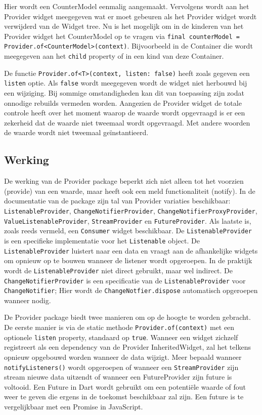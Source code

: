 Hier wordt een CounterModel eenmalig aangemaakt. Vervolgens wordt aan het Provider widget meegegeven wat er moet gebeuren als het Provider widget wordt verwijderd van de Widget tree. Nu is het mogelijk om in de kinderen van het Provider widget het CounterModel op te vragen via \verb|final counterModel = Provider.of<CounterModel>(context)|.
Bijvoorbeeld in de Container die wordt meegegeven aan het \verb|child| property of in een kind van deze Container.

De functie \verb|Provider.of<T>(context, listen: false)| heeft zoals gegeven een \verb|listen| optie. Als \verb|false| wordt meegegeven wordt de widget niet herbouwd bij een wijziging. Bij sommige omstandigheden kan dit van toepassing zijn zodat onnodige rebuilds vermeden worden. Aangezien de Provider widget de totale controle heeft over het moment waarop de waarde wordt opgevraagd is er een zekerheid dat de waarde niet tweemaal wordt opgevraagd. Met andere woorden de waarde wordt niet tweemaal geïnstantieerd.

\subsection*{Werking}
De werking van de Provider package beperkt zich niet alleen tot het voorzien (provide) van een waarde, maar heeft ook een meld functionaliteit (notify).
In de documentatie van de package zijn tal van Provider variaties beschikbaar: \verb|ListenableProvider|, \verb|ChangeNotifierProvider|, \verb|ChangeNotifierProxyProvider|, \verb|ValueListenableProvider|, \verb|StreamProvider| en \verb|FutureProvider|. Als laatste is, zoals reeds vermeld, een \verb|Consumer| widget beschikbaar.
De \verb|ListenableProvider| is een specifieke implementatie voor het \verb|Listenable| object. De \verb|ListenableProvider| luistert naar een data en vraagt aan de afhankelijke widgets om opnieuw op te bouwen wanneer de listener wordt opgeroepen. In de praktijk wordt de \verb|ListenableProvider| niet direct gebruikt, maar wel indirect. De \verb|ChangeNotifierProvider| is een specificatie van de \verb|ListenableProvider| voor \verb|ChangeNotifier|; Hier wordt de \verb|ChangeNotfier.dispose| automatisch opgeroepen wanneer nodig.

De Provider package biedt twee manieren om op de hoogte te worden gebracht.
De eerste manier is via de static methode \verb|Provider.of(context)| met een optionele \verb|listen| property, standaard op \verb|true|.
Wanneer een widget zichzelf registreert als een dependency van de Provider InheritedWidget, zal het telkens opnieuw opgebouwd worden wanneer de data wijzigt. Meer bepaald wanneer \verb|notifyListeners()| wordt opgeroepen of wanneer een \verb|StreamProvider| zijn stream nieuwe data uitzendt of wanneer een FutureProvider zijn future is voltooid. Een Future in Dart wordt gebruikt om een potentiële waarde of fout weer te geven die ergens in de toekomst beschikbaar zal zijn. Een future is te vergelijkbaar met een Promise in JavaScript.

